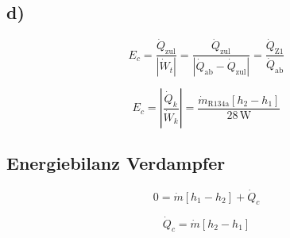 

\subsection*{d)}
\begin{equation*}
    E_c = \frac{\dot{Q}_{\text{zul}}}{\left| \dot{W}_t \right|} = \frac{\dot{Q}_{\text{zul}}}{\left| \dot{Q}_{\text{ab}} - \dot{Q}_{\text{zul}} \right|} = \frac{\dot{Q}_{\text{Z1}}}{\dot{Q}_{\text{ab}}}
\end{equation*}

\begin{equation*}
    E_c = \left| \frac{\dot{Q}_k}{\dot{W}_k} \right| = \frac{\dot{m}_{\text{R134a}} \left[ h_2 - h_1 \right]}{28 \, \text{W}}
\end{equation*}

\subsection*{Energiebilanz Verdampfer}
\begin{equation*}
    0 = \dot{m} \left[ h_1 - h_2 \right] + \dot{Q}_c
\end{equation*}

\begin{equation*}
    \dot{Q}_c = \dot{m} \left[ h_2 - h_1 \right]
\end{equation*}